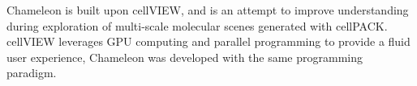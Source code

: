 \documentclass{egpubl}
\begin{document}
	
	Chameleon is built upon cellVIEW, and is an attempt to improve understanding during exploration of multi-scale molecular scenes generated with cellPACK.
	cellVIEW leverages GPU computing and parallel programming to provide a fluid user experience, Chameleon was developed with the same programming paradigm.
	
\end{document}
